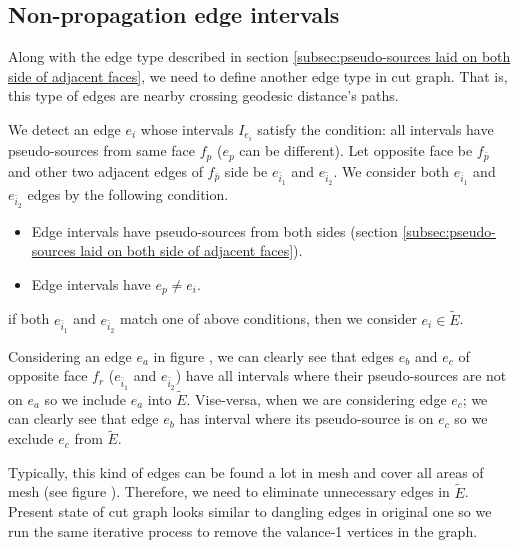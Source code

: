 \documentclass[a4paper,twoside]{article}
\begin{document}
\subsection{Non-propagation edge intervals}
\label{subsec:intervals fail to propagate}
Along with the edge type described in section \ref{subsec:pseudo-sources laid on both side of adjacent faces},  we need to define another edge type in cut graph. That is, this type of edges are nearby crossing geodesic distance's paths.

We detect an edge $e_i$ whose intervals $I_{e_i}$ satisfy the condition: all intervals have pseudo-sources from same face $f_p$ ($e_p$ can be different). Let opposite face be $f_{\bar{p}}$ and other two adjacent edges of $f_{\bar{p}}$ side be $e_{\bar{i}_1}$ and $e_{\bar{i}_2}$. We consider both $e_{\bar{i}_1}$ and $e_{\bar{i}_2}$ edges by the following condition.
\begin{itemize}
	\item Edge intervals have pseudo-sources from both sides (section \ref{subsec:pseudo-sources laid on both side of adjacent faces}).
	\item Edge intervals have $e_p \neq e_i$.
\end{itemize}

if both $e_{\bar{i}_1}$ and $e_{\bar{i}_2}$ match one of above conditions, then we consider $e_i \in \tilde{E}$. 

Considering an edge $e_a$ in figure , we can clearly see that edges $e_b$ and $e_c$ of opposite face $f_r$ ($e_{\bar{i}_1}$ and $e_{\bar{i}_2}$) have all intervals where their pseudo-sources are not on $e_a$ so we include $e_a$ into $\tilde{E}$. Vise-versa, when we are considering edge $e_c$; we can clearly see that edge $e_b$ has interval where its pseudo-source is on $e_c$ so we exclude $e_c$ from $\tilde{E}$.

Typically, this kind of edges can be found a lot in mesh and cover all areas of mesh (see figure ). Therefore, we need to eliminate unnecessary edges in $\tilde{E}$. Present state of cut graph looks similar to dangling edges in original one so we run the same iterative process to remove the valance-1 vertices in the graph. 
\end{document}

